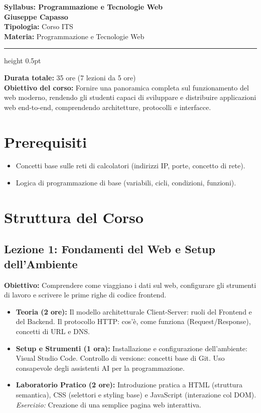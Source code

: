 \documentclass[11pt,a4paper]{article}
\newcommand{\proposaltitle}[1]{
    \begin{center}
        \vspace*{0.1cm}
        {\LARGE \bfseries \color{blue} #1} \\[1.5ex]
        {\large \textbf{Giuseppe Capasso}} \\[1ex]
        \small{
            \vspace{0.1cm}
            \textbf{Tipologia:} Corso ITS\\
            \textbf{Materia:} Programmazione e Tecnologie Web\\ 
        }
    \end{center}
    \vspace{0.3cm}
    \hrule height 0.5pt
    \vspace{0.5cm}
}
\begin{document}
\proposaltitle{Syllabus: Programmazione e Tecnologie Web}

\noindent
\textbf{Durata totale:} 35 ore (7 lezioni da 5 ore)\\
\textbf{Obiettivo del corso:} Fornire una panoramica completa sul funzionamento del web moderno, rendendo gli studenti capaci di sviluppare e distribuire applicazioni web end-to-end, comprendendo architetture, protocolli e interfacce.

\section*{Prerequisiti}
\begin{itemize}[label=\textbullet]
    \item Concetti base sulle reti di calcolatori (indirizzi IP, porte, concetto di rete).
    \item Logica di programmazione di base (variabili, cicli, condizioni, funzioni).
\end{itemize}

\section*{Struttura del Corso}

\subsection*{Lezione 1: Fondamenti del Web e Setup dell'Ambiente}
\textbf{Obiettivo:} Comprendere come viaggiano i dati sul web, configurare gli strumenti di lavoro e scrivere le prime righe di codice frontend.
\begin{itemize}
    \item \textbf{Teoria (2 ore):} Il modello architetturale Client-Server: ruoli del Frontend e del Backend. Il protocollo HTTP: cos'è, come funziona (Request/Response), concetti di URL e DNS.
    \item \textbf{Setup e Strumenti (1 ora):} Installazione e configurazione dell'ambiente: Visual Studio Code. Controllo di versione: concetti base di Git. Uso consapevole degli assistenti AI per la programmazione.
    \item \textbf{Laboratorio Pratico (2 ore):} Introduzione pratica a HTML (struttura semantica), CSS (selettori e styling base) e JavaScript (interazione col DOM). \textit{Esercizio:} Creazione di una semplice pagina web interattiva.
\end{itemize}
\end{document}

